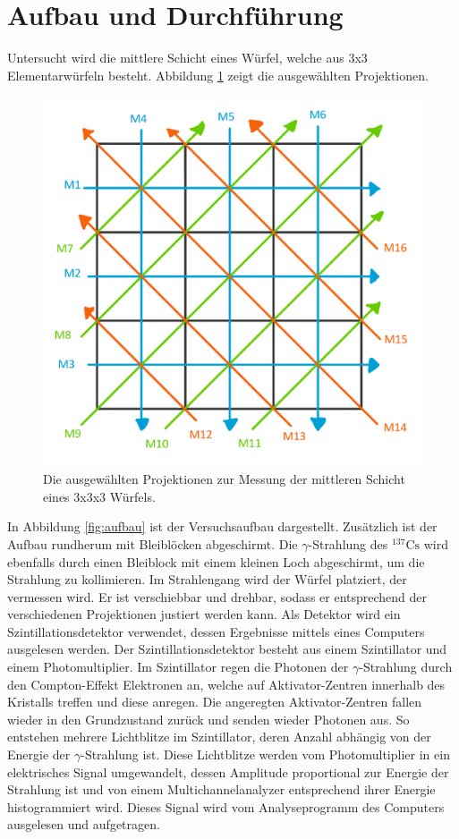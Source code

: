 \section{Aufbau und Durchführung}

Untersucht wird die mittlere Schicht eines Würfel, welche aus 3x3 Elementarwürfeln besteht. Abbildung \ref{fig:wuerfel} zeigt die ausgewählten Projektionen.

\begin{figure}
 \centering
 \includegraphics[scale=0.5]{graphics/wuerfel.png}
 \caption{Die ausgewählten Projektionen zur Messung der mittleren Schicht eines 3x3x3 Würfels.}
 \label{fig:wuerfel}
\end{figure}

In Abbildung \ref{fig:aufbau} ist der Versuchsaufbau dargestellt. Zusätzlich ist der Aufbau rundherum mit Bleiblöcken abgeschirmt. Die $\gamma$-Strahlung
des ${}^{137}\text{Cs}$ wird ebenfalls durch einen Bleiblock mit einem kleinen Loch abgeschirmt, um die Strahlung zu kollimieren.
Im Strahlengang wird der Würfel platziert, der vermessen wird. Er ist verschiebbar und drehbar, sodass er entsprechend der verschiedenen
Projektionen justiert werden kann. Als Detektor wird ein Szintillationsdetektor verwendet, dessen Ergebnisse mittels eines Computers ausgelesen werden.
Der Szintillationsdetektor besteht aus einem Szintillator und einem Photomultiplier. Im Szintillator regen die Photonen der $\gamma$-Strahlung durch den Compton-Effekt Elektronen an,
welche auf Aktivator-Zentren innerhalb des Kristalls treffen und diese anregen. Die angeregten Aktivator-Zentren fallen wieder in den Grundzustand zurück und senden wieder Photonen aus.
So entstehen mehrere Lichtblitze im Szintillator, deren Anzahl abhängig von der Energie der $\gamma$-Strahlung ist. Diese
Lichtblitze werden vom Photomultiplier in ein elektrisches Signal umgewandelt, dessen Amplitude proportional zur Energie der Strahlung ist und von einem
Multichannelanalyzer entsprechend ihrer Energie histogrammiert wird. Dieses Signal wird vom Analyseprogramm des Computers ausgelesen und aufgetragen.

